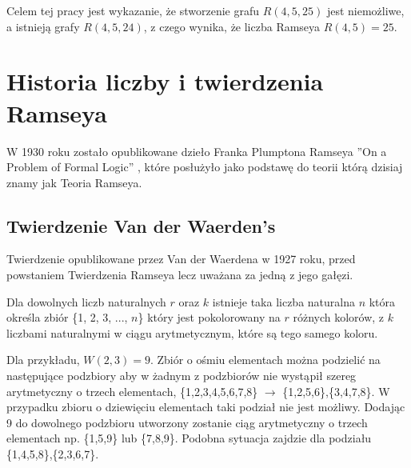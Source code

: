  \begin{figure}[H]
  \centering
    \caption{}
    \label{pgram}
 \end{figure}

Celem tej pracy jest wykazanie, że stworzenie grafu $R(4,5,25)$ jest niemożliwe, a istnieją grafy $R(4,5,24)$, z czego wynika, że liczba Ramseya $R(4,5) = 25$.


\section{Historia liczby i twierdzenia Ramseya}

W 1930 roku zostało opublikowane dzieło Franka Plumptona Ramseya ''On a Problem of Formal Logic''\cite{ramsey} , które posłużyło jako podstawę do teorii którą dzisiaj znamy jak Teoria Ramseya. 


\subsection{Twierdzenie Van der Waerden's}
Twierdzenie opublikowane przez Van der Waerdena w 1927 roku, przed powstaniem Twierdzenia Ramseya lecz uważana za jedną z jego gałęzi. 

\begin{theorem}
Dla dowolnych liczb naturalnych $r$ oraz $k$ istnieje taka liczba naturalna $n$ która określa zbiór \{1, 2, 3, ..., $n$\} który jest pokolorowany na $r$ różnych kolorów, z $k$ liczbami naturalnymi w ciągu arytmetycznym, które są tego samego koloru.\cite{theory} 
\end{theorem}

Dla przykładu, $W(2,3) = 9$. Zbiór o ośmiu elementach można podzielić na następujące podzbiory aby w żadnym z podzbiorów nie wystąpił szereg arytmetyczny o trzech elementach, \{1,2,3,4,5,6,7,8\} $\to$ \{1,2,5,6\},\{3,4,7,8\}. W przypadku zbioru o dziewięciu elementach taki podział nie jest możliwy. Dodając 9 do dowolnego podzbioru utworzony zostanie ciąg arytmetyczny o trzech elementach np. \{1,5,9\} lub \{7,8,9\}. Podobna sytuacja zajdzie dla podziału \{1,4,5,8\},\{2,3,6,7\}.

